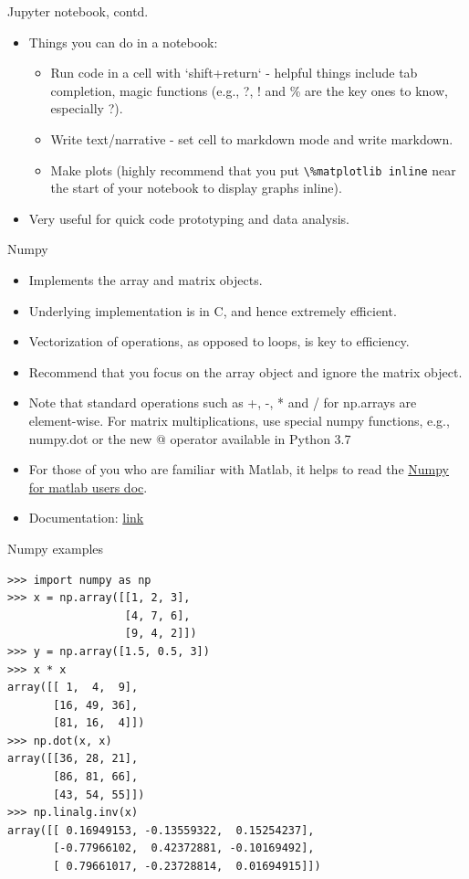 \documentclass[aspectratio=169]{beamer}
\begin{document}
\begin{frame}{Jupyter notebook, contd.}
    \begin{itemize}
        \item Things you can do in a notebook:
        \begin{itemize}
            \item Run code in a cell with `shift+return` - helpful things include tab completion, magic functions (e.g., ?, ! and \% are the key ones to know, especially ?).
            \item Write text/narrative - set cell to markdown mode and write markdown.
            \item Make plots (highly recommend that you put \lstinline{\%matplotlib inline} near the start of your notebook to display graphs inline).
        \end{itemize}
        \item Very useful for quick code prototyping and data analysis.
    \end{itemize}
\end{frame}


\begin{frame}{Numpy}
    \begin{itemize}
        \item Implements the array and matrix objects.
        \item Underlying implementation is in C, and hence extremely efficient.
        \item Vectorization of operations, as opposed to loops, is key to efficiency.
        \item Recommend that you focus on the array object and ignore the matrix object.
        \item Note that standard operations such as +, -, * and / for np.arrays are element-wise. For matrix multiplications, use special numpy functions, e.g., numpy.dot or the new @ operator available in Python 3.7
        \item For those of you who are familiar with Matlab, it helps to read the \href{https://docs.scipy.org/doc/numpy/user/numpy-for-matlab-users.html}{Numpy for matlab users doc}.
        \item Documentation: \href{http://docs.scipy.org/doc/numpy/}{link}
    \end{itemize}
\end{frame}


\begin{frame}[fragile]{Numpy examples}
    \begin{lstlisting}
>>> import numpy as np
>>> x = np.array([[1, 2, 3],
                  [4, 7, 6],
                  [9, 4, 2]])
>>> y = np.array([1.5, 0.5, 3])
>>> x * x
array([[ 1,  4,  9],
       [16, 49, 36],
       [81, 16,  4]])
>>> np.dot(x, x)
array([[36, 28, 21],
       [86, 81, 66],
       [43, 54, 55]])
>>> np.linalg.inv(x)
array([[ 0.16949153, -0.13559322,  0.15254237],
       [-0.77966102,  0.42372881, -0.10169492],
       [ 0.79661017, -0.23728814,  0.01694915]])
       \end{lstlisting}
\end{frame}
\end{document}
